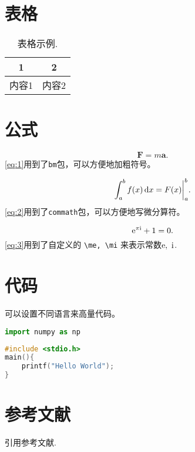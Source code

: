 \section{表格}


\begin{table}[htp]
   \centering
   \caption{表格示例.}
   \begin{tabular}{cc}
      \toprule  1 & 2   \\
      \midrule
      内容1         & 内容2 \\
      \bottomrule
   \end{tabular}
   \label{tab:1}
\end{table}

\section{公式}


\begin{equation}
   \bm{F} = m\bm{a}.
   \label{eq:1}
\end{equation}
\cref{eq:1}用到了\texttt{bm}包，可以方便地加粗符号。

\begin{equation}
   \int^b_a f(x) \dif x=F(x)\bigg|^b_a.
   \label{eq:2}
\end{equation}
\cref{eq:2}用到了\texttt{commath}包，可以方便地写微分算符。

\begin{equation}
   \mathrm{e} ^{\pi \mathrm{i}} + 1 = 0.
   \label{eq:3}
\end{equation}
\cref{eq:3}用到了自定义的 \verb"\me, \mi" 来表示常数$\mathrm{e},\ \mathrm{i}$.

\section{代码}

可以设置不同语言来高量代码。

\begin{lstlisting}[language=python]
import numpy as np
\end{lstlisting}

\begin{lstlisting}[language=c]
#include <stdio.h>
main(){
	printf("Hello World");
}
\end{lstlisting}

\section{参考文献}

引用参考文献.
